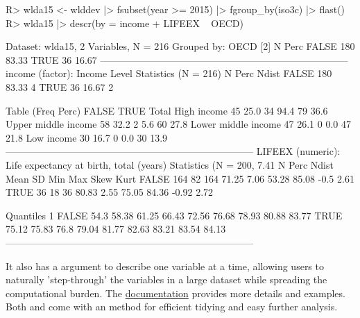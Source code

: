 \documentclass[nojss]{jss} %
\newcommand{\fct}[1]{\code{#1()}}
\begin{document}
\begin{Schunk}
\begin{Sinput}
R> wlda15 <- wlddev |> fsubset(year >= 2015) |> fgroup_by(iso3c) |> flast()
R> wlda15 |> descr(by = income + LIFEEX ~ OECD)
\end{Sinput}
\begin{Soutput}
Dataset: wlda15, 2 Variables, N = 216
Grouped by: OECD [2]
         N   Perc
FALSE  180  83.33
TRUE    36  16.67
-----------------------------------------------------------------------------
income (factor): Income Level
Statistics (N = 216)
         N   Perc  Ndist
FALSE  180  83.33      4
TRUE    36  16.67      2

Table (Freq Perc)
                       FALSE     TRUE    Total
High income          45 25.0  34 94.4  79 36.6
Upper middle income  58 32.2   2  5.6  60 27.8
Lower middle income  47 26.1   0  0.0  47 21.8
Low income           30 16.7   0  0.0  30 13.9
-----------------------------------------------------------------------------
LIFEEX (numeric): Life expectancy at birth, total (years)
Statistics (N = 200, 7.41% NAs)
         N  Perc  Ndist   Mean    SD    Min    Max   Skew  Kurt
FALSE  164    82    164  71.25  7.06  53.28  85.08   -0.5  2.61
TRUE    36    18     36  80.83  2.55  75.05  84.36  -0.92  2.72

Quantiles
          1%     5%    10%    25%    50%    75%    90%    95%    99%
FALSE   54.3  58.38  61.25  66.43  72.56  76.68  78.93  80.88  83.77
TRUE   75.12  75.83   76.8  79.04  81.77  82.63  83.21  83.54  84.13
-----------------------------------------------------------------------------
\end{Soutput}
\end{Schunk}

%
 It also has a  argument to describe one variable at a time, allowing users to naturally 'step-through' the variables in a large dataset while spreading the computational burden. The \href{https://sebkrantz.github.io/collapse/reference/descr.html}{documentation} provides more details and examples. Both \fct{qsu} and \fct{descr} come with an  method for efficient tidying and easy further analysis. \newline
\end{document}
